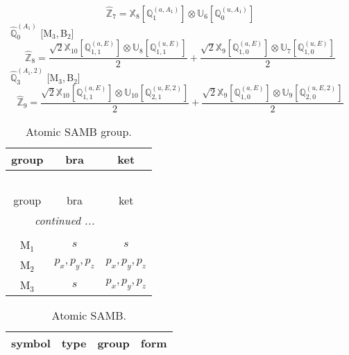 \documentclass[fleqn,10pt,landscape]{article}
\begin{document}
\begin{itemize}
\begin{dmath*}
\hat{\mathbb{Z}}_{7}=\mathbb{X}_{8}[\mathbb{Q}_{1}^{(a,A_{1})}] \otimes\mathbb{U}_{6}[\mathbb{Q}_{0}^{(u,A_{1})}]
\end{dmath*}
\vspace{4mm}
\noindent {} $\,\,\,\hat{\mathbb{Q}}_{0}^{(A_{1})}$ [M$_{3}$,\,B$_{2}$]
\begin{dmath*}
\hat{\mathbb{Z}}_{8}=\frac{\sqrt{2} \mathbb{X}_{10}[\mathbb{Q}_{1,1}^{(a,E)}] \otimes\mathbb{U}_{8}[\mathbb{Q}_{1,1}^{(u,E)}]}{2} + \frac{\sqrt{2} \mathbb{X}_{9}[\mathbb{Q}_{1,0}^{(a,E)}] \otimes\mathbb{U}_{7}[\mathbb{Q}_{1,0}^{(u,E)}]}{2}
\end{dmath*}
\vspace{4mm}
\noindent {} $\,\,\,\hat{\mathbb{Q}}_{3}^{(A_{1},2)}$ [M$_{3}$,\,B$_{2}$]
\begin{dmath*}
\hat{\mathbb{Z}}_{9}=\frac{\sqrt{2} \mathbb{X}_{10}[\mathbb{Q}_{1,1}^{(a,E)}] \otimes\mathbb{U}_{10}[\mathbb{Q}_{2,1}^{(u,E,2)}]}{2} + \frac{\sqrt{2} \mathbb{X}_{9}[\mathbb{Q}_{1,0}^{(a,E)}] \otimes\mathbb{U}_{9}[\mathbb{Q}_{2,0}^{(u,E,2)}]}{2}
\end{dmath*}
\begin{center}
\renewcommand{\arraystretch}{1.3}
\begin{longtable}{c|c|c}
\caption{Atomic SAMB group.}
 \\
 \hline \hline
group & bra & ket \\ \hline \endfirsthead

\multicolumn{2}{l}{\tablename\ \thetable{}} \\
 \hline \hline
group & bra & ket \\ \hline \endhead

 \hline \hline
\multicolumn{2}{r}{\footnotesize\it continued ...} \\ \endfoot

 \hline \hline
\multicolumn{2}{r}{} \\ \endlastfoot

M$_{1}$ & $s$ & $s$ \\
M$_{2}$ & $p_{x}, p_{y}, p_{z}$ & $p_{x}, p_{y}, p_{z}$ \\
M$_{3}$ & $s$ & $p_{x}, p_{y}, p_{z}$ \\
\end{longtable}
\end{center}
\begin{center}
\renewcommand{\arraystretch}{1.3}
\begin{longtable}{c|c|c|c}
\caption{Atomic SAMB.}
 \\
 \hline \hline
symbol & type & group & form \\ \hline \endfirsthead


\end{longtable}
\end{center}
\end{itemize}
\end{document}
